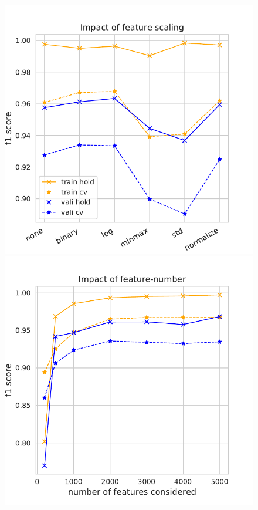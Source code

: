 \documentclass[11pt]{article}
\begin{document}
\begin{figure}
\begin{minipage}[l]{0.3\textwidth}
\includegraphics[width=1\linewidth]{email_spam/perc_scaling.pdf}
\end{minipage}
\begin{minipage}[l]{0.3\textwidth}
\includegraphics[width=1\linewidth]{email_spam/perc_features.pdf}

\end{minipage}
\end{figure}
\end{document}
